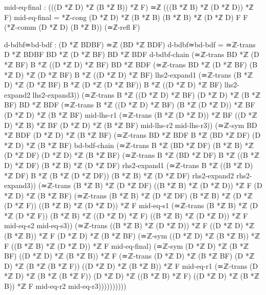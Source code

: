 \documentclass[11pt,a4paper]{book}
\begin{document}
\begin{code}
        mid-eq-final : (((D *ℤ D) *ℤ (B *ℤ B)) *ℤ F) ≃ℤ (((B *ℤ B) *ℤ (D *ℤ D)) *ℤ F)
        mid-eq-final = *ℤ-cong {(D *ℤ D) *ℤ (B *ℤ B)} {(B *ℤ B) *ℤ (D *ℤ D)} {F} {F}
                        (*ℤ-comm (D *ℤ D) (B *ℤ B)) (≃ℤ-refl F)
        
        d-bdbf≃bd-bdf : (D *ℤ BDBF) ≃ℤ (BD *ℤ BDF)
        d-bdbf≃bd-bdf = ≃ℤ-trans {D *ℤ BDBF} {BD *ℤ (D *ℤ BF)} {BD *ℤ BDF}
          d-bdbf-chain
          (≃ℤ-trans {BD *ℤ (D *ℤ BF)} {B *ℤ ((D *ℤ D) *ℤ BF)} {BD *ℤ BDF}
            (≃ℤ-trans {BD *ℤ (D *ℤ BF)} {(B *ℤ D) *ℤ (D *ℤ BF)} {B *ℤ ((D *ℤ D) *ℤ BF)}
              lhs2-expand1
              (≃ℤ-trans {(B *ℤ D) *ℤ (D *ℤ BF)} {B *ℤ (D *ℤ (D *ℤ BF))} {B *ℤ ((D *ℤ D) *ℤ BF)}
                lhs2-expand2 lhs2-expand3))
            (≃ℤ-trans {B *ℤ ((D *ℤ D) *ℤ BF)} {(D *ℤ D) *ℤ (B *ℤ BF)} {BD *ℤ BDF}
              (≃ℤ-trans {B *ℤ ((D *ℤ D) *ℤ BF)} {(B *ℤ (D *ℤ D)) *ℤ BF} {(D *ℤ D) *ℤ (B *ℤ BF)}
                mid-lhs-r1
                (≃ℤ-trans {(B *ℤ (D *ℤ D)) *ℤ BF} {((D *ℤ D) *ℤ B) *ℤ BF} {(D *ℤ D) *ℤ (B *ℤ BF)}
                  mid-lhs-r2 mid-lhs-r3))
              (≃ℤ-sym {BD *ℤ BDF} {(D *ℤ D) *ℤ (B *ℤ BF)}
                (≃ℤ-trans {BD *ℤ BDF} {B *ℤ (BD *ℤ DF)} {(D *ℤ D) *ℤ (B *ℤ BF)}
                  bd-bdf-chain
                  (≃ℤ-trans {B *ℤ (BD *ℤ DF)} {(B *ℤ B) *ℤ (D *ℤ DF)} {(D *ℤ D) *ℤ (B *ℤ BF)}
                    (≃ℤ-trans {B *ℤ (BD *ℤ DF)} {B *ℤ ((B *ℤ D) *ℤ DF)} {(B *ℤ B) *ℤ (D *ℤ DF)}
                      rhs2-expand1
                      (≃ℤ-trans {B *ℤ ((B *ℤ D) *ℤ DF)} {B *ℤ (B *ℤ (D *ℤ DF))} {(B *ℤ B) *ℤ (D *ℤ DF)}
                        rhs2-expand2 rhs2-expand3))
                    (≃ℤ-trans {(B *ℤ B) *ℤ (D *ℤ DF)} {((B *ℤ B) *ℤ (D *ℤ D)) *ℤ F} {(D *ℤ D) *ℤ (B *ℤ BF)}
                      (≃ℤ-trans {(B *ℤ B) *ℤ (D *ℤ DF)} {(B *ℤ B) *ℤ (D *ℤ (D *ℤ F))} {((B *ℤ B) *ℤ (D *ℤ D)) *ℤ F}
                        mid-eq-s1
                        (≃ℤ-trans {(B *ℤ B) *ℤ (D *ℤ (D *ℤ F))} {(B *ℤ B) *ℤ ((D *ℤ D) *ℤ F)} {((B *ℤ B) *ℤ (D *ℤ D)) *ℤ F}
                          mid-eq-s2 mid-eq-s3))
                      (≃ℤ-trans {((B *ℤ B) *ℤ (D *ℤ D)) *ℤ F} {((D *ℤ D) *ℤ (B *ℤ B)) *ℤ F} {(D *ℤ D) *ℤ (B *ℤ BF)}
                        (≃ℤ-sym {((D *ℤ D) *ℤ (B *ℤ B)) *ℤ F} {((B *ℤ B) *ℤ (D *ℤ D)) *ℤ F} mid-eq-final)
                        (≃ℤ-sym {(D *ℤ D) *ℤ (B *ℤ BF)} {((D *ℤ D) *ℤ (B *ℤ B)) *ℤ F}
                          (≃ℤ-trans {(D *ℤ D) *ℤ (B *ℤ BF)} {(D *ℤ D) *ℤ (B *ℤ (B *ℤ F))} {((D *ℤ D) *ℤ (B *ℤ B)) *ℤ F}
                            mid-eq-r1
                            (≃ℤ-trans {(D *ℤ D) *ℤ (B *ℤ (B *ℤ F))} {(D *ℤ D) *ℤ ((B *ℤ B) *ℤ F)} {((D *ℤ D) *ℤ (B *ℤ B)) *ℤ F}
                              mid-eq-r2 mid-eq-r3))))))))))


\end{code}
\end{document}
